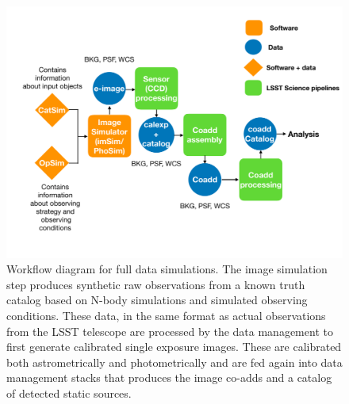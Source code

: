 \documentclass[twocolumn]{aastex62}
\begin{document}
\begin{figure}
\centering
 \includegraphics[trim={0cm 1.5cm 0cm 1.05cm}, clip, width=1.0\columnwidth]{dc1_workflow}
\caption{Workflow diagram for full data simulations. The image simulation step produces synthetic raw observations from a known truth catalog based on N-body simulations and simulated observing conditions. These data, in the same format as actual observations from the LSST telescope are processed by the data management to first generate calibrated single exposure images. These are calibrated both astrometrically and photometrically and are fed again into data management stacks that produces the image co-adds and a catalog of detected static sources. 
}

\label{fig:dc1_workflow}
\end{figure}
\end{document}
